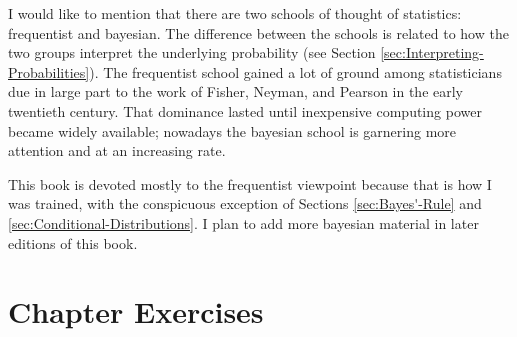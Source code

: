 \documentclass[captions=tableheading]{scrbook}
\begin{document}
I would like to mention that there are two schools of thought of statistics: frequentist and bayesian. The difference between the schools is related to how the two groups interpret the underlying probability (see Section \ref{sec:Interpreting-Probabilities}). The frequentist school gained a lot of ground among statisticians due in large part to the work of Fisher, Neyman, and Pearson in the early twentieth century. That dominance lasted until inexpensive computing power became widely available; nowadays the bayesian school is garnering more attention and at an increasing rate.

This book is devoted mostly to the frequentist viewpoint because that is how I was trained, with the conspicuous exception of Sections \ref{sec:Bayes'-Rule} and \ref{sec:Conditional-Distributions}. I plan to add more bayesian material in later editions of this book.

\section*{Chapter Exercises}
\setcounter{thm}{0}
\end{document}

